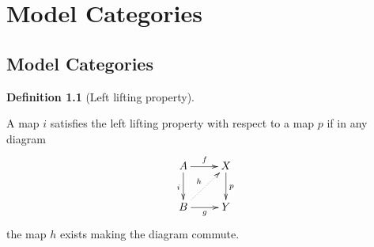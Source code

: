 \documentclass[10pt,]{book}
\theoremstyle{plain}
\theoremstyle{definition}
\newtheorem{definition}[theorem]{Definition}
\numberwithin{equation}{section}
\begin{document}
\chapter[Model Categories]{Model Categories}\label{chap-model-cats}
\typeout{************************************************}
\typeout{************************************************}
\section[Model Categories]{Model Categories}\label{sec-model-cats}
\begin{definition}[Left lifting property]\label{definition-29}

            A map \(i\) satisfies the left lifting property with respect to a map \(p\) if in any diagram
            \[
              \xymatrix{
                A \ar[r]^f \ar[d]_i & X \ar[d]^p\\B\ar@{..>}[ur]^h \ar[r]_g& Y
              }
            \]
            the map \(h\) exists making the diagram commute.
          \end{definition}
\end{document}
